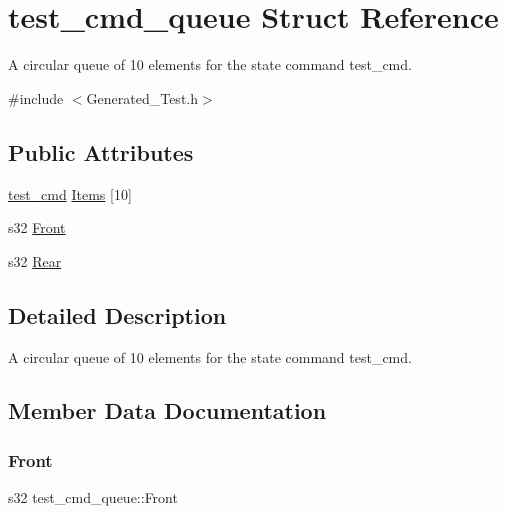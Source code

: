 \hypertarget{structtest__cmd__queue}{}\section{test\+\_\+cmd\+\_\+queue Struct Reference}
\label{structtest__cmd__queue}


A circular queue of 10 elements for the state command test\+\_\+cmd.  




{\ttfamily \#include $<$Generated\+\_\+\+Test.\+h$>$}

\subsection*{Public Attributes}
\begin{DoxyCompactItemize}
\item 
\hyperlink{PreprocTest_8h_a55ed691059222a58555cf9992ec14431}{test\+\_\+cmd} \hyperlink{structtest__cmd__queue_a893fe182353a750337200b5aad9bacb3}{Items} \mbox{[}10\mbox{]}
\item 
s32 \hyperlink{structtest__cmd__queue_a20ed55b6b8b836106c001539d2e3d599}{Front}
\item 
s32 \hyperlink{structtest__cmd__queue_a7cedef36f33507cbadf3f4ef95aa7cec}{Rear}
\end{DoxyCompactItemize}


\subsection{Detailed Description}
A circular queue of 10 elements for the state command test\+\_\+cmd. 

\subsection{Member Data Documentation}
\mbox{\label{structtest__cmd__queue_a20ed55b6b8b836106c001539d2e3d599}} 
\subsubsection{\texorpdfstring{Front}{Front}}
{\footnotesize\ttfamily s32 test\+\_\+cmd\+\_\+queue\+::\+Front}

\mbox{\label{structtest__cmd__queue_a893fe182353a750337200b5aad9bacb3}} 
